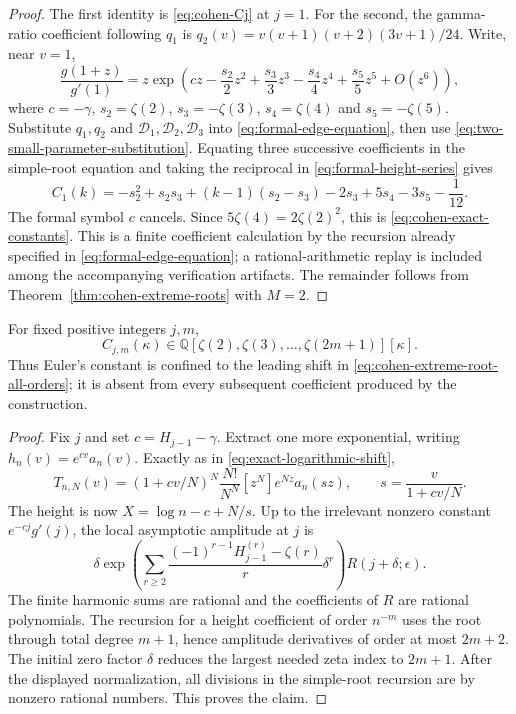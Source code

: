 \begin{proof}
The first identity is \eqref{eq:cohen-Cj} at $j=1$.  For the second,
the gamma-ratio coefficient following $q_1$ is
$q_2(v)=v(v+1)(v+2)(3v+1)/24$.  Write, near $v=1$,
\[
 \frac{g(1+z)}{g'(1)}=z\exp\left(cz-\frac{s_2}2z^2
       +\frac{s_3}3z^3-\frac{s_4}4z^4+\frac{s_5}5z^5+O(z^6)\right),
\]
where $c=-\gamma$, $s_2=\zeta(2)$, $s_3=-\zeta(3)$,
$s_4=\zeta(4)$ and $s_5=-\zeta(5)$.  Substitute $q_1,q_2$ and
$\mathcal D_1,\mathcal D_2,\mathcal D_3$ into
\eqref{eq:formal-edge-equation}, then use
\eqref{eq:two-small-parameter-substitution}.  Equating three successive
coefficients in the simple-root equation and taking the reciprocal
in \eqref{eq:formal-height-series} gives
\[
 C_1(k)=-s_2^2+s_2s_3+(k-1)(s_2-s_3)-2s_3+5s_4-3s_5-\frac1{12}.
\]
The formal symbol $c$ cancels.  Since $5\zeta(4)=2\zeta(2)^2$,
this is \eqref{eq:cohen-exact-constants}.  This is a finite
coefficient calculation by the recursion already specified in
\eqref{eq:formal-edge-equation}; a rational-arithmetic replay is
included among the accompanying verification artifacts.  The
remainder follows from Theorem~\ref{thm:cohen-extreme-roots} with $M=2$.
\end{proof}

\begin{corollary}
\label{cor:cohen-coefficient-algebra}
For fixed positive integers $j,m$,
\[
 C_{j,m}(\kappa)\in
   \mathbb Q[\zeta(2),\zeta(3),\ldots,\zeta(2m+1)][\kappa].
\]
Thus Euler's constant is confined to the leading shift in
\eqref{eq:cohen-extreme-root-all-orders}; it is absent from every
subsequent coefficient produced by the construction.
\end{corollary}

\begin{proof}
Fix $j$ and set $c=H_{j-1}-\gamma$.  Extract one more exponential,
writing $h_n(v)=e^{cv}a_n(v)$.  Exactly as in
\eqref{eq:exact-logarithmic-shift},
\[
 T_{n,N}(v)=(1+cv/N)^N
   \frac{N!}{N^N}[z^N]e^{Nz}a_n(sz),\qquad
 s=\frac{v}{1+cv/N}.
\]
The height is now $X=\log n-c+N/s$.  Up to the irrelevant nonzero
constant $e^{-cj}g'(j)$, the local asymptotic amplitude at $j$ is
\[
 \delta\exp\left(\sum_{r\geq2}
    \frac{(-1)^{r-1}H_{j-1}^{(r)}-\zeta(r)}r\delta^r\right)
       R(j+\delta;\epsilon).
\]
The finite harmonic sums are rational and the coefficients of $R$
are rational polynomials.  The recursion for a height coefficient
of order $n^{-m}$ uses the root through total degree $m+1$, hence
amplitude derivatives of order at most $2m+2$.  The initial zero
factor $\delta$ reduces the largest needed zeta index to $2m+1$.
After the displayed normalization, all divisions in the simple-root
recursion are by nonzero rational numbers.  This proves the claim.
\end{proof}

